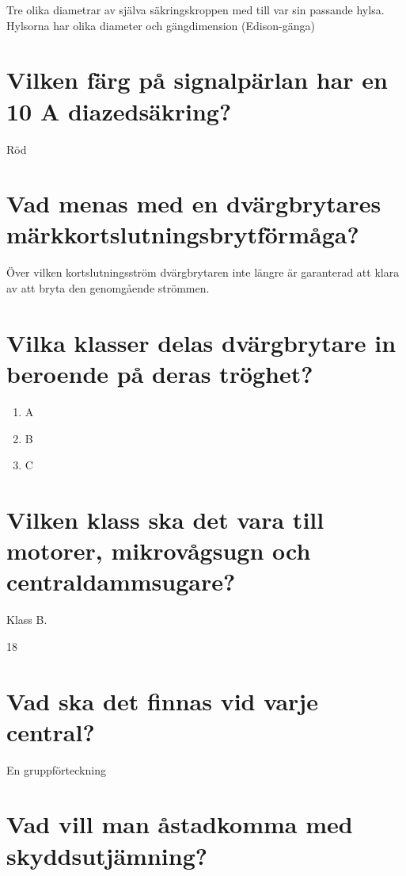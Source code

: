 \documentclass[a4paper,swedish]{article}
\begin{document}
Tre olika diametrar av själva säkringskroppen med till var sin passande hylsa.
Hylsorna har olika diameter och gängdimension (Edison-gänga)

\setcounter{section}{9}
\section{Vilken färg på signalpärlan har en 10 A diazedsäkring?}\label{sec:diazed_10A}

Röd

\setcounter{section}{11}
\section{Vad menas med en dvärgbrytares märkkortslutningsbrytförmåga?}\label{sec:RCD_short_interrupt}

Över vilken kortslutningsström dvärgbrytaren inte längre är garanterad att klara av att bryta
den genomgående strömmen.

\setcounter{section}{13}
\section{Vilka klasser delas dvärgbrytare in beroende på deras tröghet?}\label{sec:RCD_classes}

\begin{enumerate}
\item A
\item B
\item C
\end{enumerate}

\setcounter{section}{15}
\section{Vilken klass ska det vara till motorer, mikrovågsugn och centraldammsugare?}\label{sec:RCD_motordrift}

Klass B.

18\setcounter{section}{17}
\section{Vad ska det finnas vid varje central?}\label{sec:vad_ska_finnas_vid_en_central}

En gruppförteckning

\setcounter{section}{19}
\section{Vad vill man åstadkomma med skyddsutjämning?}\label{sec:skyddsutjamning}
\end{document}
